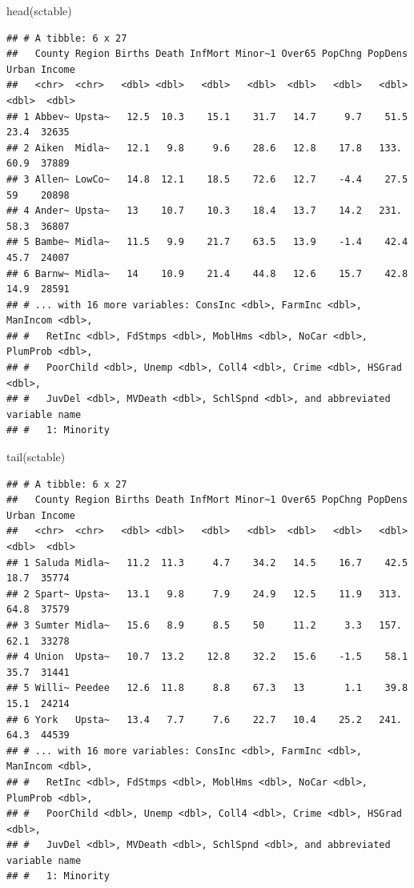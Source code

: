 \documentclass[
]{book}
\newenvironment{Shaded}{\begin{snugshade}}{\end{snugshade}}
\newcommand{\FunctionTok}[1]{\textcolor[rgb]{0.00,0.00,0.00}{#1}}
\newcommand{\NormalTok}[1]{#1}
\begin{document}
\begin{Shaded}
\begin{Highlighting}[]
\FunctionTok{head}\NormalTok{(sctable)}
\end{Highlighting}
\end{Shaded}

\begin{verbatim}
## # A tibble: 6 x 27
##   County Region Births Death InfMort Minor~1 Over65 PopChng PopDens Urban Income
##   <chr>  <chr>   <dbl> <dbl>   <dbl>   <dbl>  <dbl>   <dbl>   <dbl> <dbl>  <dbl>
## 1 Abbev~ Upsta~   12.5  10.3    15.1    31.7   14.7     9.7    51.5  23.4  32635
## 2 Aiken  Midla~   12.1   9.8     9.6    28.6   12.8    17.8   133.   60.9  37889
## 3 Allen~ LowCo~   14.8  12.1    18.5    72.6   12.7    -4.4    27.5  59    20898
## 4 Ander~ Upsta~   13    10.7    10.3    18.4   13.7    14.2   231.   58.3  36807
## 5 Bambe~ Midla~   11.5   9.9    21.7    63.5   13.9    -1.4    42.4  45.7  24007
## 6 Barnw~ Midla~   14    10.9    21.4    44.8   12.6    15.7    42.8  14.9  28591
## # ... with 16 more variables: ConsInc <dbl>, FarmInc <dbl>, ManIncom <dbl>,
## #   RetInc <dbl>, FdStmps <dbl>, MoblHms <dbl>, NoCar <dbl>, PlumProb <dbl>,
## #   PoorChild <dbl>, Unemp <dbl>, Coll4 <dbl>, Crime <dbl>, HSGrad <dbl>,
## #   JuvDel <dbl>, MVDeath <dbl>, SchlSpnd <dbl>, and abbreviated variable name
## #   1: Minority
\end{verbatim}

\begin{Shaded}
\begin{Highlighting}[]
\FunctionTok{tail}\NormalTok{(sctable)}
\end{Highlighting}
\end{Shaded}

\begin{verbatim}
## # A tibble: 6 x 27
##   County Region Births Death InfMort Minor~1 Over65 PopChng PopDens Urban Income
##   <chr>  <chr>   <dbl> <dbl>   <dbl>   <dbl>  <dbl>   <dbl>   <dbl> <dbl>  <dbl>
## 1 Saluda Midla~   11.2  11.3     4.7    34.2   14.5    16.7    42.5  18.7  35774
## 2 Spart~ Upsta~   13.1   9.8     7.9    24.9   12.5    11.9   313.   64.8  37579
## 3 Sumter Midla~   15.6   8.9     8.5    50     11.2     3.3   157.   62.1  33278
## 4 Union  Upsta~   10.7  13.2    12.8    32.2   15.6    -1.5    58.1  35.7  31441
## 5 Willi~ Peedee   12.6  11.8     8.8    67.3   13       1.1    39.8  15.1  24214
## 6 York   Upsta~   13.4   7.7     7.6    22.7   10.4    25.2   241.   64.3  44539
## # ... with 16 more variables: ConsInc <dbl>, FarmInc <dbl>, ManIncom <dbl>,
## #   RetInc <dbl>, FdStmps <dbl>, MoblHms <dbl>, NoCar <dbl>, PlumProb <dbl>,
## #   PoorChild <dbl>, Unemp <dbl>, Coll4 <dbl>, Crime <dbl>, HSGrad <dbl>,
## #   JuvDel <dbl>, MVDeath <dbl>, SchlSpnd <dbl>, and abbreviated variable name
## #   1: Minority
\end{verbatim}
\end{document}
